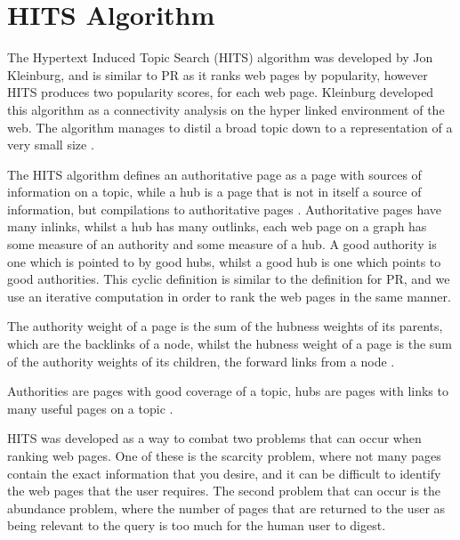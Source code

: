 \documentclass[11pt]{report}
\begin{document}
\section{HITS Algorithm} \label{sec:HITS}
The Hypertext Induced Topic Search (HITS) algorithm was developed by Jon Kleinburg, and is similar to PR as it ranks web pages by popularity, however HITS produces two popularity scores, for each web page.  Kleinburg developed this algorithm as a connectivity analysis on the hyper linked environment of the web. The algorithm manages to distil a broad topic down to a representation of a very small size \cite{kleinberg1999authoritative}. 

The HITS algorithm defines an authoritative page as a page with sources of information on a topic, while a hub is a page that is not in itself a source of information, but compilations to authoritative pages \cite{manning}. Authoritative pages have many inlinks, whilst a hub has many outlinks, each web page on a graph has some measure of an authority and some measure of a hub. A good authority is one which is pointed to by good hubs, whilst a good hub is one which points to good authorities. This cyclic definition is similar to the definition for PR, and we use an iterative computation in order to rank the web pages in the same manner.

The authority weight of a page is the sum of the hubness weights of its parents, which are the backlinks of a node, whilst the hubness weight of a page is the sum of the authority weights of its children, the forward links from a node \cite{baldi2003modeling}.

{Authorities are pages with good coverage of a topic, hubs are pages with links to many useful pages on a topic \cite{bonato}.} 

HITS was developed as a way to combat two problems that can occur when ranking web pages. One of these is the scarcity problem, where not many pages contain the exact information that you desire, and it can be difficult to identify the web pages that the user requires. The second problem that can occur is the abundance problem, where the number of pages that are returned to the user as being relevant to the query is too much for the human user to digest. 
\end{document}

